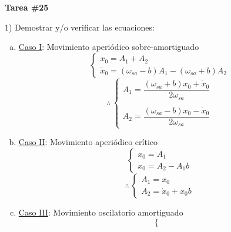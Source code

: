 \documentclass[letter,11pt]{article}
\begin{document}
\begin{center}
    {\Large \bf{Tarea \#25}}
\end{center}

1) Demostrar y/o verificar las ecuaciones:

\begin{enumerate}[a)]
    \item \underline{Caso I}: Movimiento aperiódico sobre-amortiguado
        \begin{equation*}
            \begin{cases}
                x_0 = A_1 + A_2 \\
                \dot{x}_0 = (\omega_{sa} - b) A_1 - (\omega_{sa} + b) A_2
            \end{cases}
        \end{equation*}
        \begin{equation*}
            \therefore\,
            \begin{cases}
                A_1 = \dfrac{(\omega_{sa} + b) x_0 + \dot{x}_0}{2\omega_{sa}} \\
                \\
                A_2 = \dfrac{(\omega_{sa} - b) x_0 - \dot{x}_0}{2\omega_{sa}}
            \end{cases}
        \end{equation*}
        \vspace{0.1cm}
    \item \underline{Caso II}: Movimiento aperiódico crítico
        \begin{equation*}
            \begin{cases}
                x_0 = A_1 \\
                \dot{x}_0 = A_2 - A_1 b
            \end{cases}
        \end{equation*}
        \begin{equation*}
            \therefore\,
            \begin{cases}
                A_1 = x_0 \\
                A_2 = \dot{x}_0 + x_0 b
            \end{cases}
        \end{equation*}
        \vspace{0.1cm}
    \item \underline{Caso III}: Movimiento oscilatorio amortiguado
        \begin{equation*}
            \begin{cases}

\end{cases}
\end{equation*}
\end{enumerate}
\end{document}
